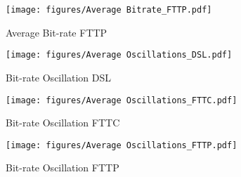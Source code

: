 \documentclass[10pt,sigconf]{acmart}
\begin{document}
\begin{figure}
    \centering
    \texttt{[image: figures/Average Bitrate\_FTTP.pdf]}
    \caption{Average Bit-rate FTTP}
    \label{fig:avg-bitrate-FTTP}
\end{figure}

\begin{figure}
    \centering
    \texttt{[image: figures/Average Oscillations\_DSL.pdf]}
    \caption{ Bit-rate Oscillation DSL}
    \label{fig:avg-oscillation-DSL}
\end{figure}

\begin{figure}
    \centering
    \texttt{[image: figures/Average Oscillations\_FTTC.pdf]}
    \caption{ Bit-rate Oscillation FTTC}
    \label{fig:avg-oscillation-FTTC}
\end{figure}

\begin{figure}
    \centering
    \texttt{[image: figures/Average Oscillations\_FTTP.pdf]}
    \caption{ Bit-rate Oscillation FTTP}
    \label{fig:avg-oscillation-FTTP}
\end{figure}



\end{document}
